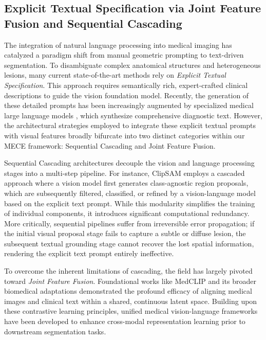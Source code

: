 \documentclass[onecolumn]{IEEEtran}
\numberwithin{equation}{section}
\theoremstyle{definition}
\theoremstyle{remark}
\begin{document}
\subsection{Explicit Textual Specification via Joint Feature Fusion and Sequential Cascading}

The integration of natural language processing \cite{chowdhary2020natural} into medical imaging has catalyzed a paradigm shift from manual geometric prompting to text-driven segmentation. To disambiguate complex anatomical structures and heterogeneous lesions, many current state-of-the-art methods rely on \textit{Explicit Textual Specification}. This approach requires semantically rich, expert-crafted clinical descriptions to guide the vision foundation model. Recently, the generation of these detailed prompts has been increasingly augmented by specialized medical large language models \cite{sellergren2025medgemma}, which synthesize comprehensive diagnostic text. However, the architectural strategies employed to integrate these explicit textual prompts with visual features broadly bifurcate into two distinct categories within our MECE framework: Sequential Cascading and Joint Feature Fusion.

Sequential Cascading architectures decouple the vision and language processing stages into a multi-step pipeline. For instance, ClipSAM \cite{li2024clipsam} employs a cascaded approach where a vision model first generates class-agnostic region proposals, which are subsequently filtered, classified, or refined by a vision-language model based on the explicit text prompt. While this modularity simplifies the training of individual components, it introduces significant computational redundancy. More critically, sequential pipelines suffer from irreversible error propagation; if the initial visual proposal stage fails to capture a subtle or diffuse lesion, the subsequent textual grounding stage cannot recover the lost spatial information, rendering the explicit text prompt entirely ineffective.

To overcome the inherent limitations of cascading, the field has largely pivoted toward \textit{Joint Feature Fusion}. Foundational works like MedCLIP \cite{wang2022medclip} and its broader biomedical adaptations \cite{liu2023clip, zhang2025biomedclip} demonstrated the profound efficacy of aligning medical images and clinical text within a shared, continuous latent space. Building upon these contrastive learning principles, unified medical vision-language frameworks \cite{fan2024medslip, khattak2024unimed} have been developed to enhance cross-modal representation learning prior to downstream segmentation tasks. 
\end{document}
